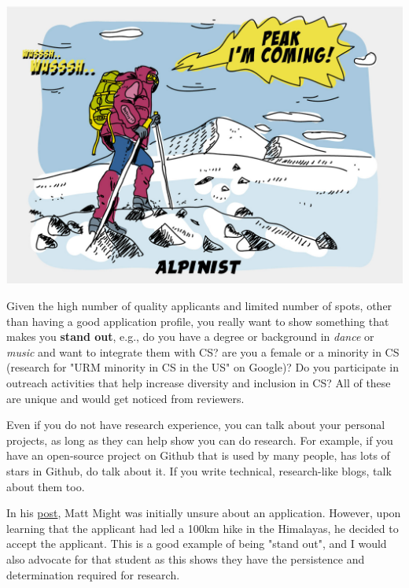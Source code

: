 \documentclass[oneside,11pt]{memoir}
\begin{document}
\begin{center}
  \includegraphics[scale=0.2]{files/alpinist-climbing-peak-mountain-comic-hand-drawn-vector-illustration.jpg}
\end{center}


Given the high number of quality applicants and limited number of spots, other than having a good application profile, you really want to show something that makes you \textbf{stand out}, e.g., do you have a degree or background in \emph{dance} or \emph{music} and want to integrate them with CS? are you a female or a minority in CS (research for "URM minority in CS in the US" on Google)? Do you participate in outreach activities that help increase diversity and inclusion in CS? All of these are unique and would get noticed from reviewers.

Even if you do not have research experience, you can talk about your personal projects, as long as they can help show you can do research. For example, if you have an open-source project on Github that is used by many people, has lots of stars in Github, do talk about it. If you write technical, research-like blogs, talk about them too.


In his \href{https://matt.might.net/articles/how-to-apply-and-get-in-to-graduate-school-in-science-mathematics-engineering-or-computer-science/}{post}, Matt Might was initially unsure about an application. However, upon learning that the applicant had led a 100km hike in the Himalayas, he decided to accept the applicant.  This is a good example of being "stand out", and I would also advocate for that student as this shows they have the persistence and determination required for research.
\end{document}
